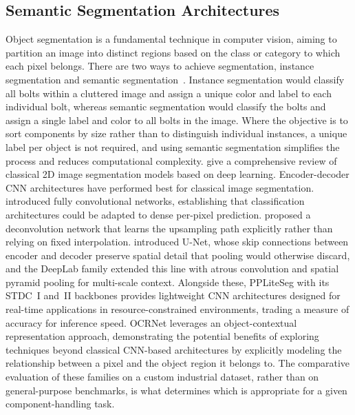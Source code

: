 \subsection{Semantic Segmentation Architectures}\label{subsec:lit_segmentation}

Object segmentation is a fundamental technique in computer vision, aiming to partition an image into
distinct regions based on the class or category to which each pixel belongs. There are two ways to
achieve segmentation, instance segmentation and semantic segmentation~\citep{yin2022bridging}.
Instance segmentation would classify all bolts within a cluttered image and assign a unique color
and label to each individual bolt, whereas semantic segmentation would classify the bolts and assign
a single label and color to all bolts in the image. Where the objective is to sort components by
size rather than to distinguish individual instances, a unique label per object is not required, and
using semantic segmentation simplifies the process and reduces computational
complexity. \citet{mo2022review} give a comprehensive review of classical 2D image segmentation models based on deep learning. Encoder-decoder CNN architectures have performed best for classical image segmentation. \citet{long2015fully} introduced fully convolutional networks, establishing that
classification architectures could be adapted to dense per-pixel prediction.
\citet{noh2015learning} proposed a deconvolution network that learns the upsampling path explicitly
rather than relying on fixed interpolation. \citet{ronneberger2015unet} introduced U-Net, whose skip
connections between encoder and decoder preserve spatial detail that pooling would otherwise
discard, and the DeepLab family extended this line with atrous convolution and spatial pyramid
pooling for multi-scale context. Alongside these, PPLiteSeg with its STDC~I and~II backbones provides lightweight CNN architectures designed for real-time applications in resource-constrained environments, trading a measure of accuracy for inference speed. OCRNet leverages an object-contextual representation approach, demonstrating the potential benefits of exploring techniques beyond classical CNN-based architectures by explicitly modeling the relationship between a pixel and the object region it belongs to. The comparative evaluation of these families on a custom
industrial dataset, rather than on general-purpose benchmarks, is what determines which is
appropriate for a given component-handling task.

